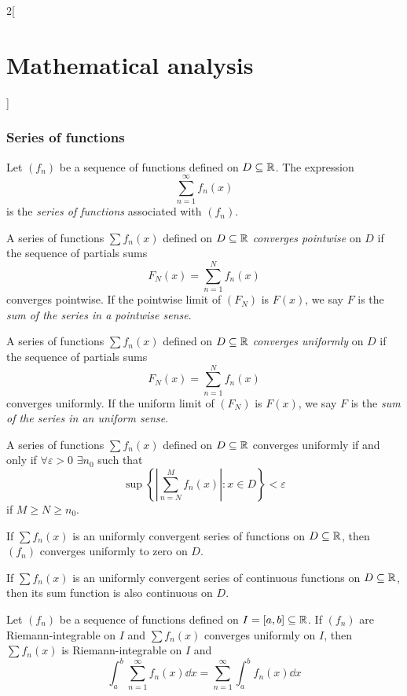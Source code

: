 \documentclass[../../../main.tex]{subfiles}
\begin{document}
\begin{multicols}{2}[\section{Mathematical analysis}]
  \subsubsection{Series of functions}
  \begin{definition}
    Let $(f_n)$ be a sequence of functions defined on $D\subseteq\mathbb{R} $. The expression $$\sum_{n=1}^\infty f_n(x)$$ is the \emph{series of functions} associated with $(f_n)$.
  \end{definition}
  \begin{definition}
    A series of functions $\sum f_n(x)$ defined on $D\subseteq\mathbb{R} $ \emph{converges pointwise} on $D$ if the sequence of partials sums $$F_N(x)=\sum_{n=1}^Nf_n(x)$$ converges pointwise. If the pointwise limit of $(F_N)$ is $F(x)$, we say $F$ is the \emph{sum of the series in a pointwise sense}.
  \end{definition}
  \begin{definition}
    A series of functions $\sum f_n(x)$ defined on $D\subseteq\mathbb{R} $ \emph{converges uniformly} on $D$ if the sequence of partials sums $$F_N(x)=\sum_{n=1}^Nf_n(x)$$ converges uniformly. If the uniform limit of $(F_N)$ is $F(x)$, we say $F$ is the \emph{sum of the series in an uniform sense}.
  \end{definition}
  \begin{theorem}
    A series of functions $\sum f_n(x)$ defined on $D\subseteq\mathbb{R} $ converges uniformly if and only if $\forall\varepsilon>0$ $\exists n_0$ such that $$\sup\left\{\left|\sum_{n=N}^Mf_n(x)\right|:x\in D\right\}< \varepsilon$$ if $M\geq N\geq n_0$.
  \end{theorem}
  \begin{corollary}
    If $\sum f_n(x)$ is an uniformly convergent series of functions on $D\subseteq\mathbb{R} $, then $(f_n)$ converges uniformly to zero on $D$.
  \end{corollary}
  \begin{theorem}
    If $\sum f_n(x)$ is an uniformly convergent series of continuous functions on $D\subseteq\mathbb{R} $, then its sum function is also continuous on $D$.
  \end{theorem}
  \begin{theorem}
    Let $(f_n)$ be a sequence of functions defined on $I=[a,b]\subseteq\mathbb{R} $. If $(f_n)$ are Riemann-integrable on $I$ and $\sum f_n(x)$ converges uniformly on $I$, then $\sum f_n(x)$ is Riemann-integrable on $I$ and $$\int_a^b\sum_{n=1}^\infty f_n(x) \dd{x}=\sum_{n=1}^\infty \int_a^bf_n(x) \dd{x}$$
  \end{theorem}

\end{multicols}
\end{document}
